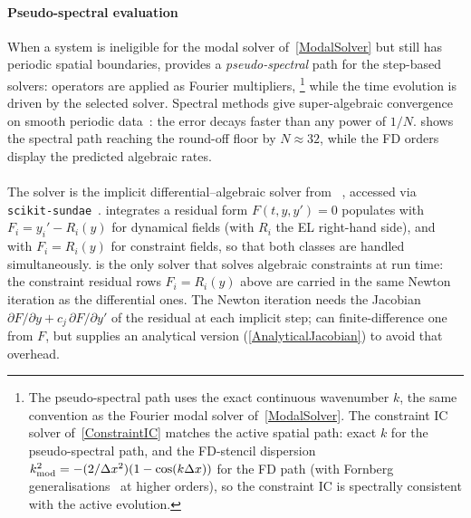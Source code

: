 \paragraph*{Pseudo-spectral evaluation}
When a system is ineligible for the modal solver
of~\cref{ModalSolver} but still has periodic spatial boundaries,
\TIDAL{} provides a
\emph{pseudo-spectral} path for the
step-based solvers:
operators are applied as Fourier
multipliers,%
\footnote{The pseudo-spectral path uses the exact continuous wavenumber $k$,
the same convention as the Fourier modal
solver of~\cref{ModalSolver}. The constraint IC
solver of~\cref{ConstraintIC} matches the active spatial path:
exact $k$ for the pseudo-spectral path, and the FD-stencil dispersion
$k_{\rm mod}^2 = -(2/\Delta x^2)(1-\cos(k\Delta x))$ for the FD path
(with Fornberg generalisations~\cite{fornberg1988generation} at
higher orders), so the constraint IC is spectrally consistent with
the active evolution.}
while the time evolution is driven by the selected solver.
Spectral methods give super-algebraic convergence on smooth periodic
data~\cite{boyd2001chebyshev}: the error decays faster than any power
of $1/N$.  shows the spectral path reaching the
round-off floor by $N\approx 32$, while the FD orders display the
predicted algebraic rates.

\paragraph*{\IDA{}}
The \IDA{} solver is the implicit differential--algebraic
solver from \SUNDIALS{}~\cite{gardner2022sundials,hindmarsh2005sundials}, accessed via
\lstinline!scikit-sundae!~\cite{randall2024skitsundae}.
\IDA{} integrates a residual form $F(t, y, y') = 0$
\TIDAL{} populates with $F_i = y_i'- R_i(y)$ for
dynamical fields (with $R_i$ the EL right-hand side),
and with $F_i = R_i(y)$ for constraint fields, so that both classes are
handled simultaneously. \IDA{} is the only \TIDAL{} solver that
solves algebraic constraints at run time: the constraint residual
rows $F_i = R_i(y)$ above are carried in the same Newton iteration as
the differential ones. The Newton iteration needs the Jacobian
$\partial F/\partial y + c_j\,\partial F/\partial y'$ of the residual
at each implicit step; \SUNDIALS{} can finite-difference one from
$F$, but \TIDAL{} supplies an analytical version
(\cref{AnalyticalJacobian}) to avoid that overhead.


